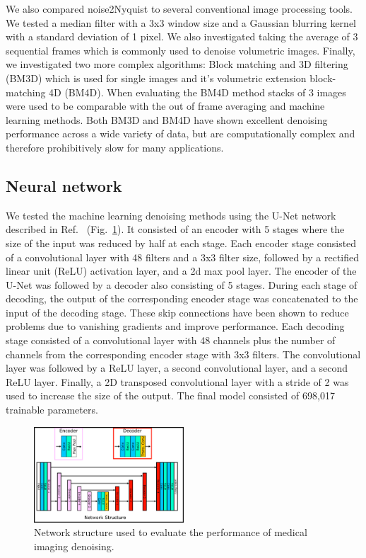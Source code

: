 \documentclass[journal,twoside,web]{ieeecolor}
\begin{document}
We also compared noise2Nyquist to several conventional image processing tools. We tested a median filter with a 3x3 window size and a Gaussian blurring kernel with a standard deviation of 1 pixel. We also investigated taking the average of 3 sequential frames which is commonly used to denoise volumetric images. Finally, we investigated two more complex algorithms: Block matching and 3D filtering (BM3D) which is used for single images\cite{Dabov2007} and it's volumetric extension block-matching 4D (BM4D)\cite{Maggioni2013}. When evaluating the BM4D method stacks of 3 images were used to be comparable with the out of frame averaging and machine learning methods. Both BM3D and BM4D have shown excellent denoising performance across a wide variety of data, but are computationally complex and therefore prohibitively slow for many applications.

\subsection{Neural network}
We tested the machine learning denoising methods using the U-Net network described in Ref.~\cite{Lehtinen2018a} (Fig.~\ref{fig:netStructure}). It consisted of an encoder with 5 stages where the size of the input was reduced by half at each stage. Each encoder stage consisted of a convolutional layer with 48 filters and a 3x3 filter size, followed by a rectified linear unit (ReLU) activation layer, and a 2d max pool layer. The encoder of the U-Net was followed by a decoder also consisting of 5 stages. During each stage of decoding, the output of the corresponding encoder stage was concatenated to the input of the decoding stage. These skip connections have been shown to reduce problems due to vanishing gradients and improve performance\cite{He_2016_CVPR}. Each decoding stage consisted of a convolutional layer with 48 channels plus the number of channels from the corresponding encoder stage with 3x3 filters. The convolutional layer was followed by a ReLU layer, a second convolutional layer, and a second ReLU layer. Finally, a 2D transposed convolutional layer with a stride of 2 was used to increase the size of the output. The final model consisted of 698,017 trainable parameters.

\begin{figure}[htb]
	\begin{center}
	\includegraphics[width=0.5\textwidth]{networkStructure}
	\caption{\label{fig:netStructure}Network structure used to evaluate the performance of medical imaging denoising.}
	\end{center}
\end{figure}
\end{document}
